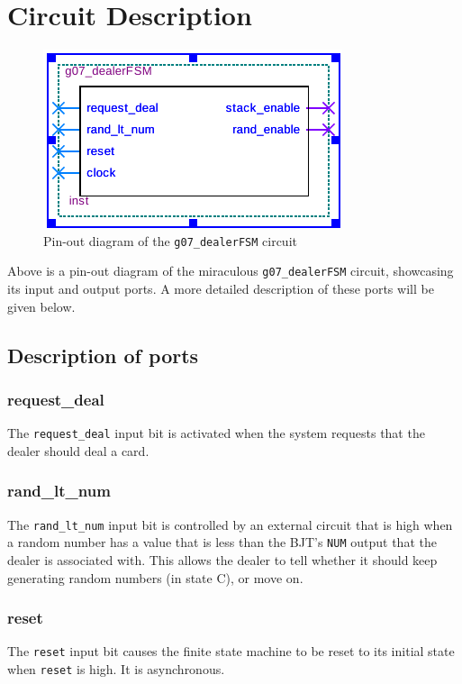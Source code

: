 \documentclass[12pt]{report}
\begin{document}
\chapter*{Circuit Description}

\begin{figure}[h]
	\begin{center}
		\caption{Pin-out diagram of the \texttt{g07\_dealerFSM} circuit}
		\includegraphics[scale=1.3]{dealer_symb}
	\end{center}
\end{figure}

Above is a pin-out diagram of the miraculous \texttt{g07\_dealerFSM} circuit, showcasing its input
and output ports. A more detailed description of these ports will be given below.

\section*{Description of ports}
\subsection*{request\_deal}
The \texttt{request\_deal} input bit is activated when the system requests that the dealer should
deal a card.
\subsection*{rand\_lt\_num}
The \texttt{rand\_lt\_num} input bit is controlled by an external circuit that is high when a random
number has a value that is less than the BJT's \texttt{NUM} output that the dealer is associated
with. This allows the dealer to tell whether it should keep generating random numbers (in state C),
or move on.
\subsection*{reset}
The \texttt{reset} input bit causes the finite state machine to be reset to its initial state when
\texttt{reset} is high. It is asynchronous.
\end{document}

